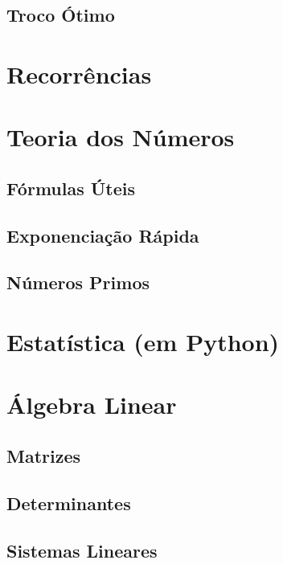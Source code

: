         \subsection{Troco Ótimo}
            
            \newpage
    \section{Recorrências}
        
        \newpage
    \section{Teoria dos Números}
        \subsection{Fórmulas Úteis}
            
            \newpage
        \subsection{Exponenciação Rápida}
            
            \newpage
        \subsection{Números Primos}
            
    \section{Estatística (em Python)}
        
        \newpage
    \section{Álgebra Linear}
        \subsection{Matrizes}
            
            \newpage
        \subsection{Determinantes}
            
            \newpage
        \subsection{Sistemas Lineares}
            
            \newpage
